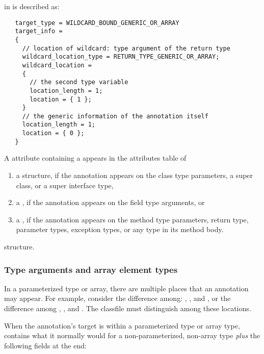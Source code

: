 \documentclass[10pt]{article}
\begin{document}
\noindent
{} in  is described as:

\begin{Verbatim}
   target_type = WILDCARD_BOUND_GENERIC_OR_ARRAY
   target_info =
   {
     // location of wildcard: type argument of the return type
     wildcard_location_type = RETURN_TYPE_GENERIC_OR_ARRAY;
     wildcard_location =
     {
       // the second type variable
       location_length = 1;
       location = { 1 };
     }
     // the generic information of the annotation itself
     location_length = 1;
     location = { 0 };
   }
\end{Verbatim}

A \RuntimeInOrVisibleTypeAnnotations attribute containing a
 appears in the attributes table of

\begin{enumerate}
\item
a  structure, if the annotation appears on the class
type parameters, a super class, or a super interface type,

\item
a , if the annotation appears on the field type
arguments, or

\item
a , if the annotation appears on the method type
parameters, return type, parameter types, exception types, or any type
in its method body.

\end{enumerate}

 structure.

\subsubsection{Type arguments and array element types\label{class-file:ext:ri:typearg}}

In a parameterized type or array, there are multiple places that an
annotation may appear.  For example, consider the difference among:
,
, and
,
or the difference  among 
,
, and
.
The classfile must distinguish among these locations.

When the annotation's target is within a parameterized type or
array type,
 contains what it normally would for a
non-parameterized, non-array type
{\em plus} the following fields at the end:
\end{document}
